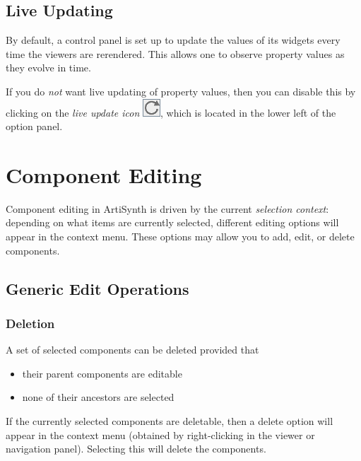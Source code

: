 \documentclass{article}
\begin{document}
\subsection{Live Updating}

By default, a control panel is set up to update the values of its
widgets every time the viewers are rerendered. This allows one to
observe property values as they evolve in time.

If you do {\it not} want live updating of property values, then you can
disable this by clicking on the {\it live update icon}
\includegraphics{images/liveUpdateIcon}, which is located in the lower left of the
option panel.

\section{Component Editing}
\label{componentEditingSec}

Component editing in ArtiSynth is driven by the current {\it selection
context}: depending on what items are currently selected, different
editing options will appear in the context menu. These options may
allow you to add, edit, or delete components.

\subsection{Generic Edit Operations}

\subsubsection{Deletion}

A set of selected components can be deleted provided that 

\begin{itemize}

\item their parent components are editable 

\item none of their ancestors are selected

\end{itemize}

If the currently selected components are deletable, then a {\sf delete}
option will appear in the context menu (obtained by right-clicking in
the viewer or navigation panel). Selecting this will delete the
components.
\end{document}

